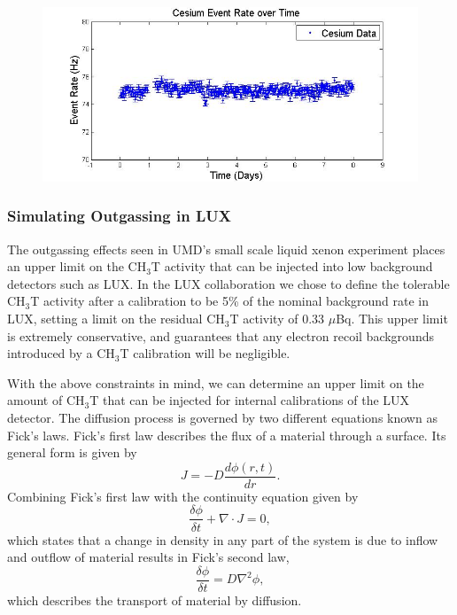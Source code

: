\begin{figure}
\includegraphics[scale=.35]{Cesium_TimeHisto.jpg} 
\label{UMDCsData}
\end{figure}

\subsubsection{Simulating Outgassing in LUX} \label{SimOutgas}

The outgassing effects seen in UMD's small scale liquid xenon experiment places an upper limit on the CH$_3$T activity that can be injected into low background detectors such as LUX.   In the LUX collaboration we chose to define the tolerable CH$_3$T activity after a calibration to be 5\% of the nominal background rate in LUX, setting a limit on the residual CH$_3$T activity of 0.33 $\mu$Bq.  This upper limit is extremely conservative, and guarantees that any electron recoil backgrounds introduced by a CH$_3$T calibration will be negligible. 

With the above constraints in mind, we can determine an upper limit on the amount of CH$_3$T that can be injected for internal calibrations of the LUX detector. The diffusion process is governed by two different equations known as Fick's laws. Fick's first law describes the flux of a material through a surface. Its general form is given by
\begin{equation}
J=-D\frac{d \phi(r,t)}{d r}.
\end{equation}
Combining Fick's first law with the continuity equation given by
\begin{equation}
\frac{\delta \phi}{\delta t} + \nabla \cdot J = 0,
\end{equation}
which states that a change in density in any part of the system is due to inflow and outflow of material results in Fick's second law,
\begin{equation}
\frac{\delta \phi}{\delta t} = D \nabla^2 \phi,
\end{equation}
which describes the transport of material by diffusion.

